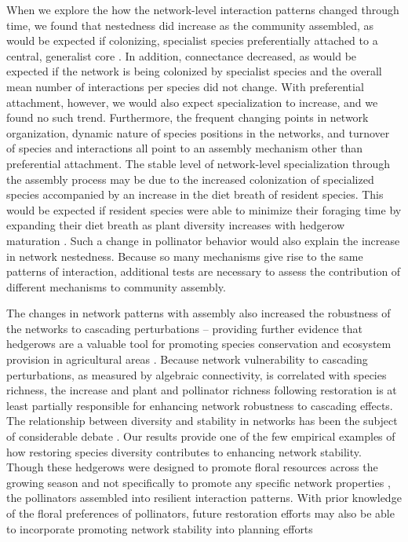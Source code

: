 \documentclass[12pt]{article}
\begin{document}
When we explore the how the network-level interaction patterns changed
through time, we found that nestedness did increase as the community
assembled, as would be expected if colonizing, specialist species
preferentially attached to a central, generalist core
\citep{albrecht2010plant}. In addition, connectance decreased, as
would be expected if the network is being colonized by specialist
species and the overall mean number of interactions per species did
not change. With preferential attachment, however, we would also
expect specialization to increase, and we found no such
trend. Furthermore, the frequent changing points in network
organization, dynamic nature of species positions in the networks, and
turnover of species and interactions all point to an assembly
mechanism other than preferential attachment.  The stable level of
network-level specialization through the assembly process may be due
to the increased colonization of specialized species
\citep{mgonigle-2015-x} accompanied by an increase in the diet breath
of resident species. This would be expected if resident species were
able to minimize their foraging time by expanding their diet breath as
plant diversity increases with hedgerow maturation \citep{Waser1996,
  pyke1984optimal, Bluthgen2007, albrecht2010plant}. Such a change in
pollinator behavior would also explain the increase in network
nestedness. Because so many mechanisms give rise to the same patterns
of interaction, additional tests are necessary to assess the contribution
of different mechanisms to community assembly.

The changes in network patterns with assembly also increased the
robustness of the networks to cascading perturbations -- providing
further evidence that hedgerows are a valuable tool for promoting
species conservation and ecosystem provision in agricultural areas
\citep{mgonigle-2015-x, ponisio2015farm, kremen-2015-602}. Because
network vulnerability to cascading perturbations, as measured by
algebraic connectivity, is correlated with species richness, the
increase and plant and pollinator richness following restoration is at
least partially responsible for enhancing network robustness to
cascading effects. The relationship between diversity and stability in
networks has been the subject of considerable debate
\citep[e.g.,][]{may1972will, pimm1984complexity,
  montoya2006ecological}. Our results provide one of the few empirical
examples of how restoring species diversity contributes to enhancing
network stability. Though these hedgerows were designed to promote
floral resources across the growing season and not specifically to
promote any specific network properties \citep{menz-2010-4}, the
pollinators assembled into resilient interaction patterns. With prior
knowledge of the floral preferences of pollinators, future restoration
efforts may also be able to incorporate promoting network stability
into planning efforts \citep{mgonigle2016tool}
\end{document}
